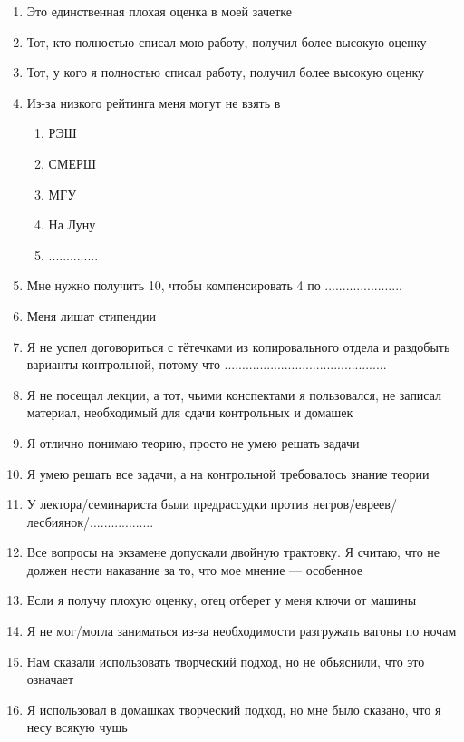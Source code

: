 \documentclass[12pt, a4paper]{article}
\begin{document}
\begin{enumerate}
\item Это единственная плохая оценка в моей зачетке
\item Тот, кто полностью списал мою работу, получил более высокую оценку
\item Тот, у кого я полностью списал работу, получил более высокую оценку
\item Из-за низкого рейтинга меня могут не взять в
\begin{enumerate}
\item РЭШ
\item СМЕРШ
\item МГУ
\item На Луну
\item ..............
\end{enumerate}
\item Мне нужно получить 10, чтобы компенсировать 4 по ......................
\item Меня лишат стипендии
\item Я не успел договориться с тётечками из копировального отдела и раздобыть варианты контрольной, потому что ..............................................
\item Я не посещал лекции, а тот, чьими конспектами я пользовался, не записал материал, необходимый для сдачи контрольных и домашек
\item Я отлично понимаю теорию, просто не умею решать задачи
\item Я умею решать все задачи, а на контрольной требовалось знание теории
\item У лектора/семинариста были предрассудки против негров/евреев/лесбиянок/..................
\item Все вопросы на экзамене допускали двойную трактовку. Я считаю, что не должен нести наказание за то, что мое мнение — особенное
\item Если я получу плохую оценку, отец отберет у меня ключи от машины
\item Я не мог/могла заниматься из-за необходимости разгружать вагоны по ночам
\item Нам сказали использовать творческий подход, но не объяснили, что это означает
\item Я использовал в домашках творческий подход,  но мне было сказано, что я несу всякую чушь

\end{enumerate}
\end{document}
